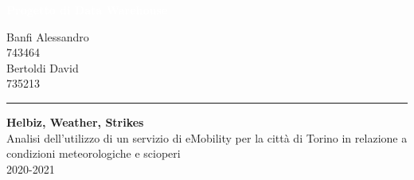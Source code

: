 \documentclass[12pt, a4paper, oneside]{report}
\author{%
    Banfi Alessandro \\
    743464 \\
    -\\
    Bertoldi David \\
    735213 \\
    -\\
    }
\begin{document}
\begin{titlepage}
\BgThispage
{}
\vspace*{0.4\textheight}
\noindent
\textcolor{white}{\Huge\textbf{\textsf{Progetto di Data Warehouse}}}
\vspace*{2cm}\par
\noindent
\begin{minipage}{0.35\linewidth}
    \begin{flushright}
        {%
    Banfi Alessandro \\
    743464 \\[2\baselineskip]
    
    Bertoldi David \\
    735213 
    
    }
    \end{flushright}
\end{minipage} \hspace{35pt}
%
\begin{minipage}{0.02\linewidth}
    \rule{1pt}{175pt}
\end{minipage} \hspace{10pt}
%
\begin{minipage}{0.63\linewidth}
\vspace{5pt}
    {\Huge\textbf{Helbiz, Weather, Strikes\\[10pt]}}
   	Analisi dell'utilizzo di un servizio di eMobility per la città di Torino
	in relazione a condizioni meteorologiche e scioperi
    \\ 2020-2021
\end{minipage}
\end{titlepage}
\restoregeometry


\newpage\tableofcontents\newpage









\end{document}
